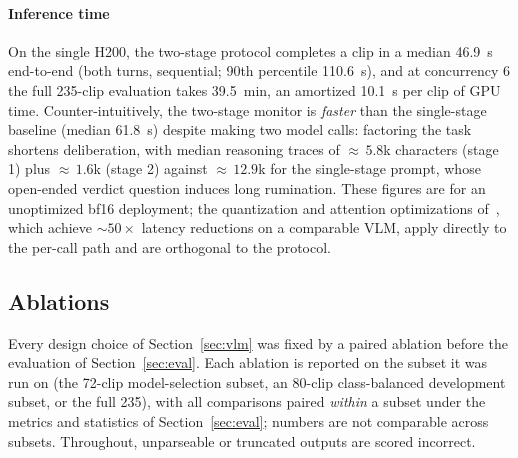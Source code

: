 \documentclass[conference]{IEEEtran}
\begin{document}
\paragraph{Inference time} On the single H200, the two-stage protocol completes a clip in a median 46.9~s end-to-end (both turns, sequential; 90th percentile 110.6~s), and at concurrency 6 the full 235-clip evaluation takes 39.5~min, an amortized 10.1~s per clip of GPU time. Counter-intuitively, the two-stage monitor is \emph{faster} than the single-stage baseline (median 61.8~s) despite making two model calls: factoring the task shortens deliberation, with median reasoning traces of ${\approx}\,5.8$k characters (stage 1) plus ${\approx}\,1.6$k (stage 2) against ${\approx}\,12.9$k for the single-stage prompt, whose open-ended verdict question induces long rumination. These figures are for an unoptimized bf16 deployment; the quantization and attention optimizations of~\cite{b13}, which achieve ${\sim}50\times$ latency reductions on a comparable VLM, apply directly to the per-call path and are orthogonal to the protocol.

\subsection{Ablations}\label{sec:ablations}

Every design choice of Section~\ref{sec:vlm} was fixed by a paired ablation before the evaluation of Section~\ref{sec:eval}. Each ablation is reported on the subset it was run on (the 72-clip model-selection subset, an 80-clip class-balanced development subset, or the full 235), with all comparisons paired \emph{within} a subset under the metrics and statistics of Section~\ref{sec:eval}; numbers are not comparable across subsets. Throughout, unparseable or truncated outputs are scored incorrect.
\end{document}

